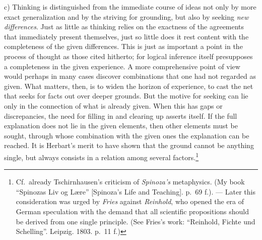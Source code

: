 \documentclass[12pt,a4paper]{book}
\begin{document}
c) Thinking is distinguished from the immediate course of ideas not only
by more exact generalization and by the striving for grounding, but also
by seeking \emph{new differences}. Just as little as thinking relies on
the exactness of the agreements that immediately present themselves,
just so little does it rest content with the completeness of the given
differences. This is just as important a point in the process of thought
as those cited hitherto; for logical inference itself presupposes a
completeness in the given experience. A more comprehensive point of view
would perhaps in many cases discover combinations that one had not
regarded as given. What matters, then, is to widen the horizon of
experience, to cast the net that seeks for facts out over deeper
grounds. But the motive for seeking can lie only in the connection of
what is already given. When this has gaps or discrepancies, the need for
filling in and clearing up asserts itself. If the full explanation does
not lie in the given elements, then other elements must be sought,
through whose combination with the given ones the explanation can be
reached. It is Herbart's merit to have shown that the ground cannot be
anything single, but always consists in a relation among
several factors.\footnote{Cf.\ already Tschirnhausen's criticism of
\emph{Spinoza's} metaphysics. (My book ``Spinozas Liv og Lære''
[Spinoza's Life and Teaching]. p.~69 f.). --- Later this consideration
was urged by \emph{Fries} against \emph{Reinhold}, who opened the era
of German speculation with the demand that all scientific propositions
should be derived from one single principle. (See Fries's work:
``Reinhold, Fichte und Schelling''. Leipzig. 1803. p.~11 f.)}
\end{document}
